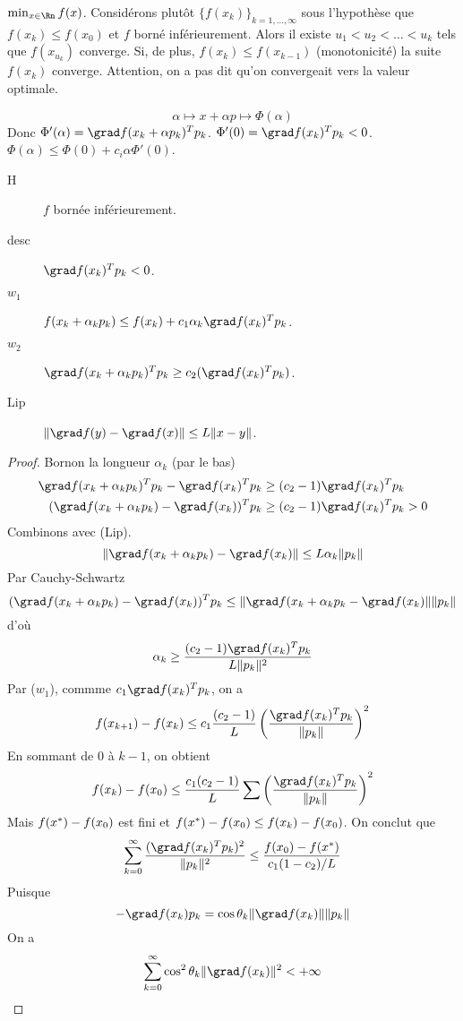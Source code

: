 \begin{myexem}
  $\min_{x \in \Rn} f(x)$.
  Considérons plutôt $\{f(x_k)\}_{k=1,\ldots,\infty}$ sous l'hypothèse
  que $f(x_k) \leq f(x_0)$ et $f$ borné inférieurement.
  Alors il existe $u_1 < u_2 < \ldots < u_k$ tels que $f(x_{u_k})$ converge.
  Si, de plus, $f(x_k) \leq f(x_{k-1})$ (monotonicité) la suite
  $f(x_k)$ converge.
  Attention, on a pas dit qu'on convergeait vers la valeur optimale.
\end{myexem}

\[ \alpha \mapsto x + \alpha p \mapsto \Phi(\alpha) \]
Donc $\Phi'(\alpha) = \grad f (x_k + \alpha p_k)^T p_k$.
$\Phi'(0) = \grad f (x_k)^Tp_k < 0$.
$\Phi(\alpha) \leq \Phi(0) + c_i\alpha\Phi'(0)$.

\begin{mytheo}

  \begin{description}
    \item[H] $f$ bornée inférieurement.
    \item[desc] $\grad f(x_k)^Tp_k < 0$.
    \item[$w_1$]
      $f(x_k + \alpha_kp_k) \leq f(x_k) + c_1\alpha_k \grad f(x_k)^Tp_k$.
    \item[$w_2$]
      $\grad f(x_k + \alpha_k p_k)^T p_k \geq c_2 (\grad f(x_k)^T p_k)$.
    \item[Lip] $\|\grad f(y) - \grad f(x)\| \leq L\|x - y\|$.
  \end{description}
  \begin{proof}
    Bornon la longueur $\alpha_k$ (par le bas)
    \begin{align*}
      \grad f(x_k + \alpha_k p_k)^T p_k - \grad f(x_k)^T p_k &
      \geq (c_2 - 1) \grad f(x_k)^T p_k\\
      (\grad f(x_k + \alpha_kp_k) - \grad f(x_k))^T p_k &
      \geq (c_2 - 1) \grad f(x_k)^Tp_k > 0
    \end{align*}
    Combinons avec (Lip).
    \[ \| \grad f(x_k + \alpha_kp_k) - \grad f(x_k) \|
    \leq L \alpha_k \|p_k\| \]
    Par Cauchy-Schwartz
    \[ (\grad f(x_k + \alpha_kp_k) - \grad f(x_k))^T p_k \leq
    \|\grad f(x_k + \alpha_kp_k - \grad f(x_k)\| \|p_k\| \]
    d'où
    \[ \alpha_k \geq \frac{(c_2-1)\grad f(x_k)^Tp_k}{L\|p_k\|^2} \]
    Par ($w_1$), commme $c_1 \grad f (x_k)^T p_k$, on a
    \[ f(x_{k+1}) - f(x_k) \leq c_1 \frac{(c_2-1)}{L}
    \left(\frac{\grad f(x_k)^T p_k}{\|p_k\|}\right)^2 \]
    En sommant de 0 à $k-1$, on obtient
    \[ f(x_k) - f(x_0) \leq \frac{c_1(c_2-1)}{L} \sum
    \left(\frac{\grad f(x_k)^T p_k}{\|p_k\|}\right)^2 \]
    Mais $f(x^*) - f(x_0)$ est fini et
    $f(x^*)-f(x_0) \leq f(x_k) - f(x_0)$.
    On conclut que
    \[ \sum_{k=0}^\infty \frac{(\grad f(x_k)^T p_k)^2}{\|p_k\|^2}
    \leq \frac{f(x_0) - f(\xopt)}{c_1(1-c_2)/L} \]
    Puisque
    \[ -\grad f(x_k) p_k = \cos \theta_k \|\grad f(x_k)\| \|p_k\| \]
    On a
    \[ \sum_{k=0}^\infty \cos^2\theta_k \|\grad f(x_k)\|^2 < +\infty \]
  \end{proof}
\end{mytheo}

